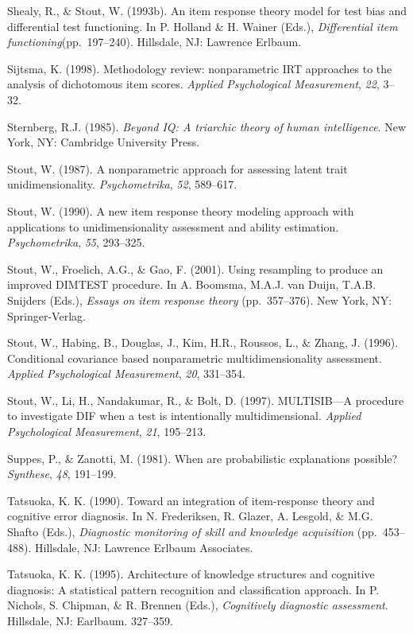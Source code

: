 \documentclass[titlepage,11pt,twoside]{article}
\begin{document}
\begin{thebibliography}
\bibitem Shealy, R., \& Stout, W. (1993b). An item response theory model for test bias and differential test functioning. In P. Holland \& H. Wainer (Eds.), \textit{Differential item functioning}(pp.~197--240). Hillsdale, NJ: Lawrence Erlbaum.

\bibitem Sijtsma, K. (1998). Methodology review: nonparametric IRT approaches to the analysis of dichotomous item scores. \textit{Applied Psychological Measurement}, \textit{22}, 3--32.

\bibitem Sternberg, R.J. (1985). \textit{Beyond IQ: A triarchic theory of human intelligence}. New York, NY: Cambridge University Press.

\bibitem Stout, W. (1987). A nonparametric approach for assessing latent trait unidimensionality. \textit{Psychometrika}, \textit{52}, 589--617.

\bibitem Stout, W. (1990). A new item response theory modeling approach with applications to unidimensionality assessment and ability estimation. \textit{Psychometrika}, \textit{55}, 293--325.

\bibitem Stout, W., Froelich, A.G., \& Gao, F. (2001). Using resampling to produce an improved DIMTEST procedure. In A. Boomsma, M.A.J. van Duijn, T.A.B. Snijders (Eds.), \textit{Essays on item response theory} (pp.~357--376). New York, NY: Springer-Verlag.

\bibitem Stout, W., Habing, B., Douglas, J., Kim, H.R., Roussos, L., \& Zhang, J. (1996). Conditional covariance based nonparametric multidimensionality assessment. \textit{Applied Psychological Measurement}, \textit{20}, 331--354.

\bibitem Stout, W., Li, H., Nandakumar, R., \& Bolt, D. (1997). MULTISIB---A procedure to investigate DIF when a test is intentionally multidimensional. \textit{Applied Psychological Measurement}, \textit{21}, 195--213.

\bibitem Suppes, P., \& Zanotti, M. (1981). When are probabilistic explanations possible? \textit{Synthese}, \textit{48}, 191--199.

\bibitem Tatsuoka, K. K. (1990). Toward an integration of item-response theory and cognitive error diagnosis. In N. Frederiksen, R. Glazer, A. Lesgold, \& M.G. Shafto (Eds.), \textit{Diagnostic monitoring of skill and knowledge acquisition} (pp.~453--488). Hillsdale, NJ: Lawrence Erlbaum Associates.


\bibitem Tatsuoka, K. K. (1995). Architecture of knowledge structures and cognitive diagnosis: A statistical pattern recognition and classification approach. In P. Nichols, S. Chipman, \& R. Brennen (Eds.), \textit{Cognitively diagnostic assessment}. Hillsdale, NJ: Earlbaum. 327--359.


\end{thebibliography}
\end{document}
